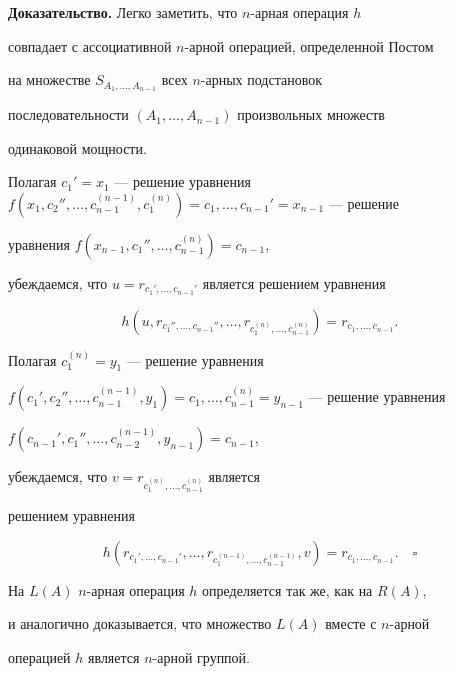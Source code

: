 {\bf Доказательство.} Легко заметить, что $n$-арная операция $h$


совпадает с ассоциативной $n$-арной операцией, определенной Постом


на множестве $S_{A_1,\dotsc,A_{n-1}}$ всех $n$-арных подстановок


последовательности $(A_1,\dotsc, A_{n-1})$ произвольных множеств


одинаковой мощности.





Полагая $c_1'=x_1$ --- решение уравнения $f(x_1,c_2'',\dotsc,c_{n-1}^{(n-1)},


c_1^{(n)})=c_1,\dotsc,c_{n-1}'=x_{n-1}$ --- решение


уравнения $f(x_{n-1},c_1'',\dotsc,c_{n-1}^{(n)})=c_{n-1}$,


убеждаемся, что $u=r_{c_1',\dotsc,c_{n-1}'}$  является решением уравнения


$$


h(u,r_{c_1'',\dotsc,c_{n-1}''},\dotsc,


r_{c_1^{(n)},\dotsc,c_{n-1}^{(n)}})=


r_{c_1,\dotsc,c_{n-1}}.


$$


Полагая $c_1^{(n)}=y_1$ --- решение уравнения


$f(c_1',c_2'',\dotsc,c_{n-1}^{(n-1)},y_1)=c_1,\dotsc,


c_{n-1}^{(n)}=y_{n-1}$ --- решение уравнения


$f(c_{n-1}',c_1'',\dotsc,c_{n-2}^{(n-1)},y_{n-1})=c_{n-1}$,


убеждаемся, что $v=r_{c_1^{(n)},\dotsc,c_{n-1}^{(n)}}$ является


решением уравнения


$$


h(r_{c_1',\dotsc,c_{n-1}'},\dotsc,


r_{c_1^{(n-1)},\dotsc,c_{n-1}^{(n-1)}},v)=r_{c_1,\dotsc,c_{n-1}}.


\quad\square


$$





На $L(A)$ $n$-арная операция $h$ определяется так же, как на $R(A)$,


и аналогично доказывается, что множество $L(A)$ вместе с $n$-арной


операцией $h$ является $n$-арной группой.





